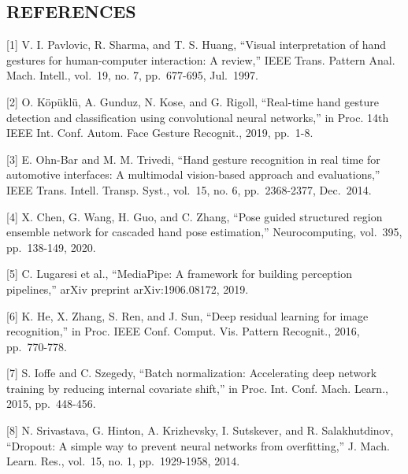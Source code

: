 \documentclass[11pt,a4paper,twoside]{article}
\begin{document}
\subsection{REFERENCES}\label{references}

{[}1{]} V. I. Pavlovic, R. Sharma, and T. S. Huang, ``Visual
interpretation of hand gestures for human-computer interaction: A
review,'' IEEE Trans. Pattern Anal. Mach. Intell., vol.~19, no. 7,
pp.~677-695, Jul.~1997.

{[}2{]} O. Köpüklü, A. Gunduz, N. Kose, and G. Rigoll, ``Real-time hand
gesture detection and classification using convolutional neural
networks,'' in Proc. 14th IEEE Int. Conf. Autom. Face Gesture Recognit.,
2019, pp.~1-8.

{[}3{]} E. Ohn-Bar and M. M. Trivedi, ``Hand gesture recognition in real
time for automotive interfaces: A multimodal vision-based approach and
evaluations,'' IEEE Trans. Intell. Transp. Syst., vol.~15, no. 6,
pp.~2368-2377, Dec.~2014.

{[}4{]} X. Chen, G. Wang, H. Guo, and C. Zhang, ``Pose guided structured
region ensemble network for cascaded hand pose estimation,''
Neurocomputing, vol.~395, pp.~138-149, 2020.

{[}5{]} C. Lugaresi et al., ``MediaPipe: A framework for building
perception pipelines,'' arXiv preprint arXiv:1906.08172, 2019.

{[}6{]} K. He, X. Zhang, S. Ren, and J. Sun, ``Deep residual learning
for image recognition,'' in Proc. IEEE Conf. Comput. Vis. Pattern
Recognit., 2016, pp.~770-778.

{[}7{]} S. Ioffe and C. Szegedy, ``Batch normalization: Accelerating
deep network training by reducing internal covariate shift,'' in Proc.
Int. Conf. Mach. Learn., 2015, pp.~448-456.

{[}8{]} N. Srivastava, G. Hinton, A. Krizhevsky, I. Sutskever, and R.
Salakhutdinov, ``Dropout: A simple way to prevent neural networks from
overfitting,'' J. Mach. Learn. Res., vol.~15, no. 1, pp.~1929-1958,
2014.
\end{document}
